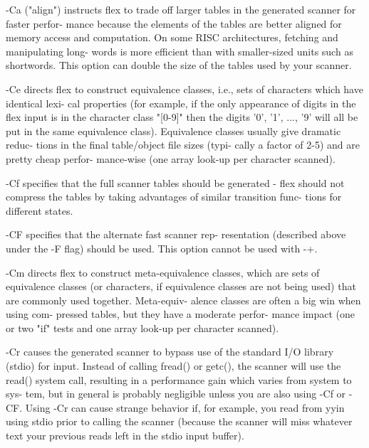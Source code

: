 \documentclass[12pt,spanish,twocolumn,lettersize]{article}
\begin{document}
{	      -Ca  ("align")  instructs	 flex to trade off larger
	      tables in the generated scanner for faster  perfor-
	      mance because the elements of the tables are better
	      aligned for memory access and computation.  On some
	      RISC architectures, fetching and manipulating long-
	      words is more  efficient	than  with  smaller-sized
	      units  such  as shortwords.  This option can double
	      the size of the tables used by your scanner.

	      -Ce directs flex to construct equivalence	 classes,
	      i.e., sets of characters which have identical lexi-
	      cal properties (for example, if the only appearance
	      of  digits  in  the  flex input is in the character
	      class "[0-9]" then the digits '0',  '1',	...,  '9'
	      will  all	 be  put  in the same equivalence class).
	      Equivalence classes usually  give	 dramatic  reduc-
	      tions  in	 the final table/object file sizes (typi-
	      cally a factor of 2-5) and are pretty cheap perfor-
	      mance-wise   (one	  array	  look-up  per	character
	      scanned).

	      -Cf specifies that the full scanner  tables  should
	      be  generated - flex should not compress the tables
	      by taking advantages of  similar	transition  func-
	      tions for different states.

	      -CF  specifies that the alternate fast scanner rep-
	      resentation (described above  under  the	-F  flag)
	      should  be  used.	  This option cannot be used with
	      -+.

	      -Cm  directs  flex  to  construct	 meta-equivalence
	      classes,	which are sets of equivalence classes (or
	      characters, if equivalence classes  are  not  being
	      used) that are commonly used together.  Meta-equiv-
	      alence classes are often a big win when using  com-
	      pressed  tables,	but  they have a moderate perfor-
	      mance impact (one or two "if" tests and  one  array
	      look-up per character scanned).

	      -Cr  causes  the generated scanner to bypass use of
	      the  standard  I/O  library  (stdio)   for   input.
	      Instead  of  calling fread() or getc(), the scanner
	      will use the read() system  call,	 resulting  in	a
	      performance  gain	 which varies from system to sys-
	      tem, but in general is probably  negligible  unless
	      you are also using -Cf or -CF.  Using -Cr can cause
	      strange behavior if, for	example,  you  read  from
	      yyin  using  stdio  prior	 to  calling  the scanner
	      (because the scanner will miss whatever  text  your
	      previous reads left in the stdio input buffer).

}
\end{document}
